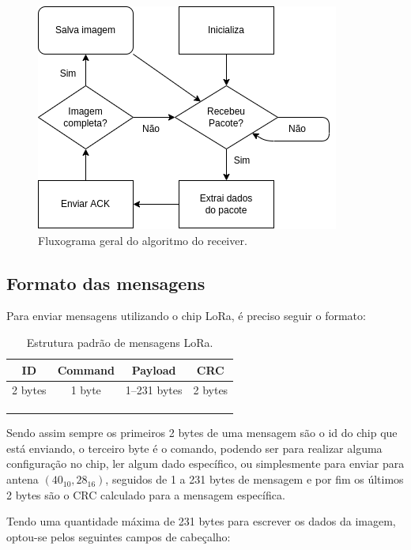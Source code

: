 \documentclass[
article,			%
12pt,				%
oneside,			%
a4paper,			%
english,			%
brazil,				%
sumario=tradicional
]{abntex2}
\begin{document}
\begin{figure}[ht]
  \centering
  \includegraphics[width=.7\textwidth]{fluxogram_recivier}
  \caption{\label{fig:recivier}Fluxograma geral do algoritmo do receiver.}
\end{figure}

\subsection{Formato das mensagens}\label{Formato das mensagens}
Para enviar mensagens utilizando o chip LoRa, é preciso seguir o formato:
\begin{table}[h]
\caption{Estrutura padrão de mensagens LoRa.}
\centering
\begin{tabular}{llll}
\hline
\multicolumn{1}{|c|}{ID}      & \multicolumn{1}{c|}{Command} & \multicolumn{1}{c|}{Payload}       & \multicolumn{1}{c|}{CRC}     \\ \hline
\multicolumn{1}{|c|}{2 bytes} & \multicolumn{1}{c|}{1 byte}  & \multicolumn{1}{c|}{1--231 bytes} & \multicolumn{1}{c|}{2 bytes} \\ \hline
 &  &  &  \\
 &  &  &  \\
 &  &  & 
\end{tabular}
\end{table}

Sendo assim sempre os primeiros 2 bytes de uma mensagem são o id do chip que está enviando, o terceiro byte é o comando, podendo ser para realizar alguma configuração no chip, ler algum dado específico, ou simplesmente para enviar para antena $(40_{10}, 28_{16})$, seguidos de 1 a 231 bytes de mensagem e por fim os últimos 2 bytes são o CRC calculado para a mensagem específica.

Tendo uma quantidade máxima de 231 bytes para escrever os dados da imagem, optou-se pelos seguintes campos de cabeçalho:
\end{document}
